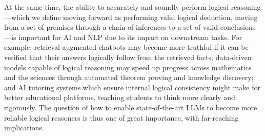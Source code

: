 \documentclass[11pt]{article}
\newcommand{\txo}[1]{\textcolor{blue}{}}
\newcommand{\txo}[1]{\textcolor{blue}{\bf\small [TXO: #1]}}
\newcommand{\cz}[1]{\textcolor{purple}{}}
\newcommand{\cz}[1]{\textcolor{purple}{\bf\small [CZ: #1]}}
\begin{document}
At the same time, the ability to accurately and soundly perform logical reasoning---which we define moving forward as performing valid logical deduction, moving from a set of premises through a chain of inferences to a set of valid conclusions---is important for AI and NLP due to its impact on downstream tasks. 
For example: retrieval-augmented chatbots may become more truthful if it can be verified that their answers logically follow from the retrieved facts;
data-driven models capable of logical reasoning may speed up progress across mathematics and the sciences through automated theorem proving and knowledge discovery;
and AI tutoring systems which ensure internal logical consistency might make for better educational platforms, teaching students to think more clearly and rigorously.
The question of how to enable state-of-the-art LLMs to become more reliable logical reasoners is thus one of great importance, with far-reaching implications.





\end{document}

